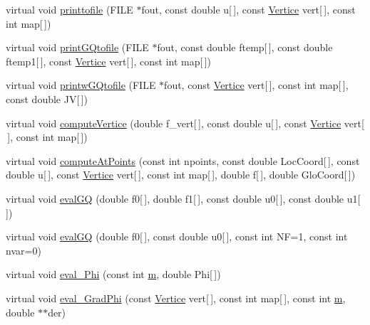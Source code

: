\begin{DoxyCompactItemize}
\item 
virtual void \hyperlink{classHexahedral_a50af1e899b7b2642cbe7a2291e949ad3}{printtofile} (F\+I\+LE $\ast$fout, const double u\mbox{[}$\,$\mbox{]}, const \hyperlink{structVertice}{Vertice} vert\mbox{[}$\,$\mbox{]}, const int map\mbox{[}$\,$\mbox{]})
\item 
virtual void \hyperlink{classHexahedral_ae32d2d1e79c93e4346fcf0b4483ae218}{print\+G\+Qtofile} (F\+I\+LE $\ast$fout, const double ftemp\mbox{[}$\,$\mbox{]}, const double ftemp1\mbox{[}$\,$\mbox{]}, const \hyperlink{structVertice}{Vertice} vert\mbox{[}$\,$\mbox{]}, const int map\mbox{[}$\,$\mbox{]})
\item 
virtual void \hyperlink{classHexahedral_a49c5ff368a7d79790d94eef711cb8537}{printw\+G\+Qtofile} (F\+I\+LE $\ast$fout, const \hyperlink{structVertice}{Vertice} vert\mbox{[}$\,$\mbox{]}, const int map\mbox{[}$\,$\mbox{]}, const double JV\mbox{[}$\,$\mbox{]})
\item 
virtual void \hyperlink{classHexahedral_a55f51d6ec6006bde842a4f72260fbdba}{compute\+Vertice} (double f\+\_\+vert\mbox{[}$\,$\mbox{]}, const double u\mbox{[}$\,$\mbox{]}, const \hyperlink{structVertice}{Vertice} vert\mbox{[}$\,$\mbox{]}, const int map\mbox{[}$\,$\mbox{]})
\item 
virtual void \hyperlink{classHexahedral_a49a57b40396ae96449b3a2aa765b1e8b}{compute\+At\+Points} (const int npoints, const double Loc\+Coord\mbox{[}$\,$\mbox{]}, const double u\mbox{[}$\,$\mbox{]}, const \hyperlink{structVertice}{Vertice} vert\mbox{[}$\,$\mbox{]}, const int map\mbox{[}$\,$\mbox{]}, double f\mbox{[}$\,$\mbox{]}, double Glo\+Coord\mbox{[}$\,$\mbox{]})
\item 
virtual void \hyperlink{classHexahedral_a56081550e866c3e12d0705da7d7908bf}{eval\+GQ} (double f0\mbox{[}$\,$\mbox{]}, double f1\mbox{[}$\,$\mbox{]}, const double u0\mbox{[}$\,$\mbox{]}, const double u1\mbox{[}$\,$\mbox{]})
\item 
virtual void \hyperlink{classHexahedral_a57cb0909590d8f68c7ea9106e4218127}{eval\+GQ} (double f0\mbox{[}$\,$\mbox{]}, const double u0\mbox{[}$\,$\mbox{]}, const int NF=1, const int nvar=0)
\item 
virtual void \hyperlink{classHexahedral_ae26647440a5b8a60d0f7075435acfe44}{eval\+\_\+\+Phi} (const int \hyperlink{DG__EI__Header_8h_a742204794ea328ba293fe59cec79b990}{m}, double Phi\mbox{[}$\,$\mbox{]})
\item 
virtual void \hyperlink{classHexahedral_a74909a28bef5ee2b4de02d571061fed8}{eval\+\_\+\+Grad\+Phi} (const \hyperlink{structVertice}{Vertice} vert\mbox{[}$\,$\mbox{]}, const int map\mbox{[}$\,$\mbox{]}, const int \hyperlink{DG__EI__Header_8h_a742204794ea328ba293fe59cec79b990}{m}, double $\ast$$\ast$der)
$$
\end{DoxyCompactItemize}
